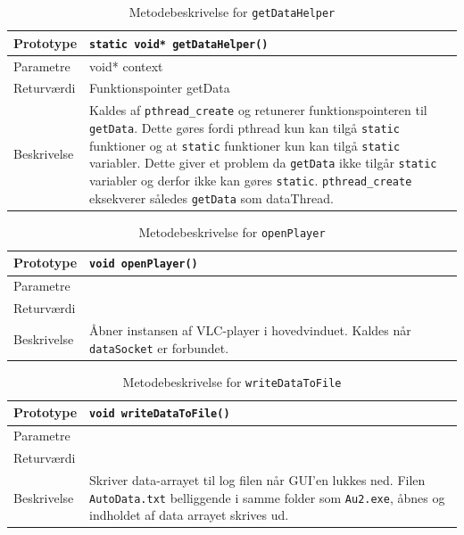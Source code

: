 \begin{table}[H]
\begin{tabularx}{\textwidth}{| L{2.5 cm} | Z |} \hline
Prototype & \texttt{static void* getDataHelper()} \\\hline
Parametre & void* context  \\\hline
Returværdi & Funktionspointer getData  \\\hline
Beskrivelse & Kaldes af \texttt{pthread\_create} og retunerer funktionspointeren til \texttt{getData}. Dette gøres fordi pthread kun kan tilgå \texttt{static} funktioner og at \texttt{static} funktioner kun kan tilgå \texttt{static} variabler. Dette giver et problem da \texttt{getData} ikke tilgår \texttt{static} variabler og derfor ikke kan gøres \texttt{static}. \texttt{pthread\_create} eksekverer således \texttt{getData} som dataThread.\\\hline
\end{tabularx}
\caption{Metodebeskrivelse for \texttt{getDataHelper}}
\label{table:met_getDataHelper}
\end{table}

\begin{table}[H]
\begin{tabularx}{\textwidth}{| L{2.5 cm} | Z |} \hline
Prototype & \texttt{void openPlayer()} \\\hline
Parametre &  \\\hline
Returværdi &  \\\hline
Beskrivelse & Åbner instansen af VLC-player i hovedvinduet. Kaldes når \texttt{dataSocket} er forbundet.  \\\hline
\end{tabularx}
\caption{Metodebeskrivelse for \texttt{openPlayer}}
\label{table:met_openPlayer}
\end{table}

\begin{table}[H]
\begin{tabularx}{\textwidth}{| L{2.5 cm} | Z |} \hline
Prototype & \texttt{void writeDataToFile()} \\\hline
Parametre &  \\\hline
Returværdi &  \\\hline
Beskrivelse & Skriver data-arrayet til log filen når GUI'en lukkes ned. Filen \texttt{AutoData.txt} belliggende i samme folder som \texttt{Au2.exe}, åbnes og indholdet af data arrayet skrives ud.  \\\hline
\end{tabularx}
\caption{Metodebeskrivelse for \texttt{writeDataToFile}}
\label{table:met_writeDataToFile}
\end{table}

